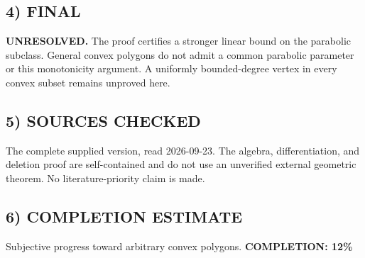 \subsection*{4) FINAL}
\textbf{UNRESOLVED.} The proof certifies a stronger linear bound on the parabolic subclass. General convex polygons do not admit a common parabolic parameter or this monotonicity argument. A uniformly bounded-degree vertex in every convex subset remains unproved here.
\subsection*{5) SOURCES CHECKED}
The complete supplied version, read 2026-09-23. The algebra, differentiation, and deletion proof are self-contained and do not use an unverified external geometric theorem. No literature-priority claim is made.
\subsection*{6) COMPLETION ESTIMATE}
Subjective progress toward arbitrary convex polygons.
\textbf{COMPLETION: 12\%}
